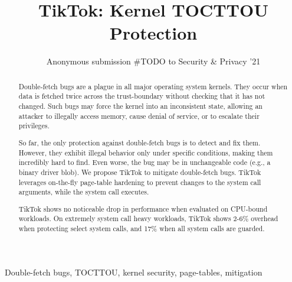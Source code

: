 \documentclass[conference]{IEEEtran}
\newcommand{\sysname}{TikTok}
\newcommand{\roughevaloverheadbad}{17\%}
\newcommand{\roughevaloverheadbetter}{2-6\%}
\begin{document}

\date{}

\title{\Large \bf TikTok: Kernel TOCTTOU Protection}

\author{
Anonymous submission \#TODO to Security \& Privacy '21
} %

\maketitle

\begin{abstract}

Double-fetch bugs are a plague in all major operating system kernels.  They
occur when data is fetched twice across the trust-boundary without checking that
it has not changed. Such bugs may force the kernel into an inconsistent state,
allowing an attacker to illegally access memory, cause denial of service, or to
escalate their privileges.

So far, the only protection against double-fetch bugs is to detect and fix them.
However, they exhibit illegal behavior only under specific conditions, making
them incredibly hard to find. Even worse, the bug may be in unchangeable code
(e.g., a binary driver blob).
%
We propose \sysname{} to mitigate double-fetch bugs.  \sysname{} leverages
on-the-fly page-table hardening to prevent changes to the system call arguments,
while the system call executes.


\sysname{} shows no noticeable drop in performance when evaluated on CPU-bound
workloads. On extremely system call heavy workloads, \sysname{} shows
\roughevaloverheadbetter{} overhead when protecting select system calls, and
\roughevaloverheadbad{} when all system calls are guarded.


\end{abstract}

\begin{IEEEkeywords}
Double-fetch bugs, TOCTTOU, kernel security, page-tables, mitigation
\end{IEEEkeywords}
\end{document}
